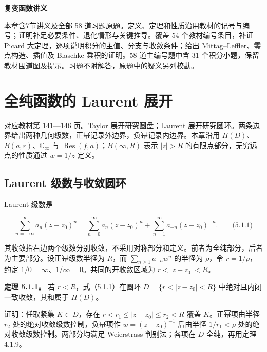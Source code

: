 \documentclass[11pt,a4paper]{article}
\begin{document}
\begin{center}
{\LARGE\bfseries 复变函数讲义\par}
\vspace{8pt}{\large 第五章\quad 全纯函数的 Laurent 展开及其应用\par}
\vspace{6pt}{\small 依史济怀、刘太顺《复变函数》\quad 教材第 141—193 页\par}
\end{center}\vspace{8pt}
本章含7节讲义及全部 58 道习题原题。定义、定理和性质沿用教材的记号与编号；证明补足必要条件、退化情形与关键推导。覆盖 54 个教材编号条目，补证 Picard 大定理，逐项说明积分的主值、分支与收敛条件；给出 Mittag–Leffler、零点构造、插值及 Blaschke 乘积的证明。58 道主编号题中含 31 个积分小题，保留教材围道图及提示。习题不附解答，原题中的疑义另列校勘。
\tableofcontents\clearpage
\section{全纯函数的 Laurent 展开}
对应教材第 141---146 页。Taylor 展开研究圆盘；Laurent
展开研究圆环。两条边界给出两种几何级数，正幂记录外边界，负幂记录内边界。本章沿用
\(H(D)\)、\(B(a,r)\)、\(\mathbb C_\infty\) 与
\(\operatorname{Res}(f,a)\)；\(B(\infty,R)\) 表示 \(|z|>R\)
的有限点部分，无穷远点的性质通过 \(w=1/z\) 定义。

\subsection{Laurent 级数与收敛圆环}\label{ch05-s1-heading-1}

Laurent 级数是

\[
\sum_{n=-\infty}^{\infty}a_n(z-z_0)^n
=\sum_{n=0}^{\infty}a_n(z-z_0)^n+\sum_{n=1}^{\infty}a_{-n}(z-z_0)^{-n}.
\qquad\text{(5.1.1)}
\]

其收敛指右边两个级数分别收敛，不采用对称部分和定义。前者为全纯部分，后者为主要部分。设正幂级数半径为
\(R\)，而 \(\sum_{n\ge1}a_{-n}w^n\) 的半径为 \(\rho\)，令
\(r=1/\rho\)，约定 \(1/0=\infty\)、\(1/\infty=0\)。共同的开收敛区域为
\(r<|z-z_0|<R\)。

\textbf{定理 5.1.1。} 若 \(r<R\)，式（5.1.1）在圆环
\(D=\{r<|z-z_0|<R\}\) 中绝对且内闭一致收敛，其和属于 \(H(D)\)。

证明：任取紧集 \(K\subset D\)，存在 \(r<r_1\le|z-z_0|\le r_2<R\) 覆盖
\(K\)。正幂项由半径 \(r_2\) 处的绝对收敛级数控制，负幂项作
\(w=(z-z_0)^{-1}\) 后由半径 \(1/r_1<\rho\)
处的绝对收敛级数控制。两部分均满足 Weierstrass 判别法；各项在 \(D\)
全纯，再用定理 4.1.9。
\end{document}
